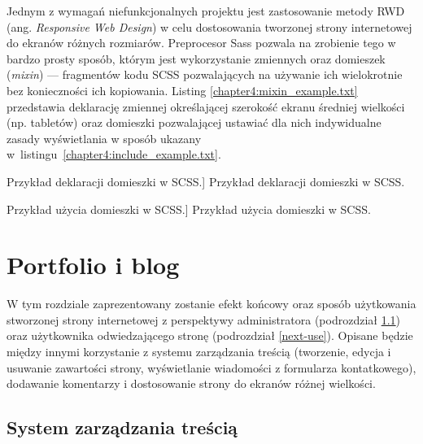 \documentclass[a4paper, 12pt]{article}
\numberwithin{figure}{section}
\begin{document}
\begin{sloppypar}
Jednym z wymagań niefunkcjonalnych projektu jest zastosowanie metody RWD (ang. \textit{Responsive Web Design}) w celu dostosowania tworzonej strony internetowej do ekranów różnych rozmiarów. Preprocesor Sass pozwala na zrobienie tego w bardzo prosty sposób, którym jest wykorzystanie zmiennych oraz domieszek (\textit{mixin}) --- fragmentów kodu SCSS pozwalających na używanie ich wielokrotnie bez konieczności ich kopiowania. Listing \ref{chapter4:mixin_example.txt} przedstawia deklarację zmiennej określającej szerokość ekranu średniej wielkości (np. tabletów) oraz domieszki pozwalającej ustawiać dla nich indywidualne zasady wyświetlania w sposób ukazany w~listingu~\ref{chapter4:include_example.txt}. 

\begin{code}[htbp]
    
    \caption
    [Przykład deklaracji domieszki w SCSS.]
    {Przykład deklaracji domieszki w SCSS.}
    \label{chapter4:mixin_example.txt}
\end{code}


\begin{code}[htbp]
    
    \caption
    [Przykład użycia domieszki w SCSS.]
    {Przykład użycia domieszki w SCSS.}
    \label{chapter4:include_example.txt}
\end{code}


\clearpage

\section{Portfolio i blog}

W tym rozdziale zaprezentowany zostanie efekt końcowy oraz sposób użytkowania stworzonej strony internetowej z perspektywy administratora (podrozdział \ref{strapi-use}) oraz użytkownika odwiedzającego stronę (podrozdział \ref{next-use}). Opisane będzie między innymi korzystanie z systemu zarządzania treścią (tworzenie, edycja i usuwanie zawartości strony, wyświetlanie wiadomości z formularza kontatkowego), dodawanie komentarzy i dostosowanie strony do ekranów różnej wielkości. 


\subsection{System zarządzania treścią} \label{strapi-use}


\end{sloppypar}
\end{document}
